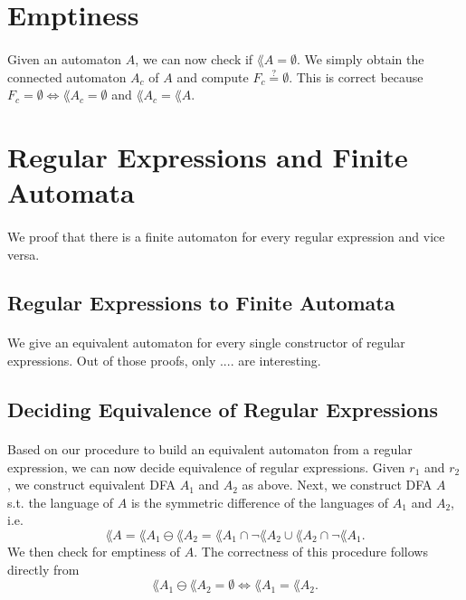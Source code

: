 \documentclass[11pt,a4paper,oneside]{book}
\begin{document}
        \section{Emptiness}
            \paragraph{}
                Given an automaton $A$, we can now check if $\lang{A} = \emptyset$. We simply obtain the connected automaton $A_c$ of $A$ and compute $F_c \stackrel{?}{=} \emptyset$. This is correct because $F_c = \emptyset \Leftrightarrow \lang{A_c} = \emptyset$ and $\lang{A_c} = \lang{A}$.

        \section{Regular Expressions and Finite Automata}

            \paragraph{} 
                We proof that there is a finite automaton for every regular expression and vice versa. 

            \subsection{Regular Expressions to Finite Automata}

                \paragraph{} 
                    We give an equivalent automaton for every single constructor of regular expressions.
                    Out of those proofs, only .... are interesting.

            \subsection{Deciding Equivalence of Regular Expressions}

                \paragraph{} 
                    Based on our procedure to build an equivalent automaton from a regular expression, we can now decide equivalence of regular expressions. Given $r_1$ and $r_2$, we construct equivalent DFA $A_1$ and $A_2$ as above.
                    Next, we construct DFA $A$ s.t. the language of $A$ is the symmetric difference of the languages of $A_1$ and $A_2$, i.e. 
                    \[ \lang{A} = \lang{A_1} \ominus \lang{A_2} = \lang{A_1} \cap \neg \lang{A_2} \cup \lang{A_2} \cap \neg \lang{A_1}.
                    \] 
                    We then check for emptiness of $A$. The correctness of this procedure follows directly from 
                    \[ 
                        \lang{A_1} \ominus \lang{A_2} = \emptyset \Leftrightarrow \lang{A_1} = \lang{A_2}.
                    \]
                    
\end{document}
